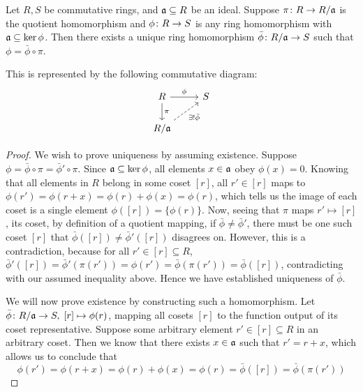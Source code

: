\begin{theorem}\label{thm:univ-prop-quotient-ring}
    Let \(R,S\) be commutative rings,
    and \(\mathfrak{a} \subseteq R\) be an ideal.
    Suppose \(\pi\colon R\to R/\mathfrak{a}\) is the quotient homomorphism
    and \(\phi\colon R\to S\) is any ring homomorphism
    with \(\mathfrak{a} \subseteq \ker\phi\).
    Then there exists a unique ring homomorphism
    \(\bar{\phi}\colon R/\mathfrak{a}\to S\) such that \(\phi = \bar{\phi}\circ\pi\).

    This is represented by the following commutative diagram:
    \begin{equation*}
        \begin{tikzcd}
            R \arrow{r}{\phi} \arrow{d}{\pi} & S \\
            R/\mfk{a} \arrow[dashrightarrow]{ru}[swap]{\exists! \bar{\phi}}
        \end{tikzcd}
    \end{equation*}
\end{theorem}
\begin{proof}
    We wish to prove uniqueness by assuming existence.
    Suppose \(\phi = \bar{\phi}\circ\pi = \bar{\phi}'\circ\pi\).
    Since \(\mathfrak{a} \subseteq \ker\phi\),
    all elements \(x \in \mathfrak{a}\) obey \(\phi(x) = 0\).
    Knowing that all elements in \(R\) belong in some coset \([r]\),
    all \(r' \in [r]\) maps to \(\phi(r') = \phi(r+x) = \phi(r)+\phi(x) = \phi(r)\),
    which tells us the image of each coset
    is a single element \(\phi([r]) = \{\phi(r)\}\).
    Now, seeing that \(\pi\) maps \(r' \mapsto [r]\), its coset,
    by definition of a quotient mapping,
    if \(\bar{\phi} \neq \bar{\phi}'\),
    there must be one such coset \([r]\)
    that \(\bar{\phi}([r]) \neq \bar{\phi}'([r])\) disagrees on.
    However, this is a contradiction,
    because for all \(r' \in [r] \subseteq R\),
    \(\bar{\phi}'([r]) = \bar{\phi}'(\pi(r')) = \phi(r')
    = \bar{\phi}(\pi(r')) = \bar{\phi}([r])\),
    contradicting with our assumed inequality above.
    Hence we have established uniqueness of \(\bar{\phi}\).

    We will now prove existence by constructing such a homomorphism.
    Let \(\bar{\phi}\colon R/\mathfrak{a}\to S,\;[r]\mapsto\phi(r)\),
    mapping all cosets \([r]\) to the function output of its coset representative.
    Suppose some arbitrary element \(r' \in [r] \subseteq R\)
    in an arbitrary coset.
    Then we know that there exists \(x \in \mathfrak{a}\) such that \(r' = r+x\),
    which allows us to conclude that
    \begin{equation*}
        \phi(r') = \phi(r+x) = \phi(r) + \phi(x)
        = \phi(r) = \bar{\phi}([r]) = \bar{\phi}(\pi(r'))
    \end{equation*}
\end{proof}

